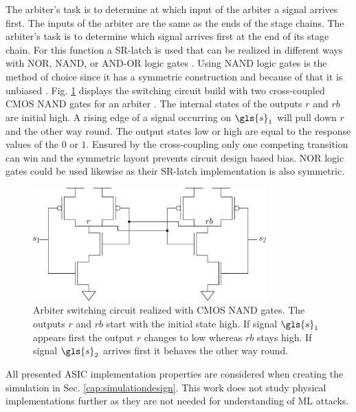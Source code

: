 The arbiter's task is to determine at which input of the arbiter a signal arrives first.
The inputs of the arbiter are the same as the ends of the stage chains.
The arbiter's task is to determine which signal arrives first at the end of its stage chain.
For this function a \ac{SR-latch} is used that can be realized in different ways with NOR, NAND, or AND-OR logic gates \cite{2016Flip-flopWikipedia}.
Using NAND logic gates is the method of choice since it has a symmetric construction and because of that it is unbiased \cite{Lin2010Low-powerFunctions, Maes2013PhysicallyApplications.}.
Fig. \ref{fig:nandarbiter} displays the switching circuit build with two cross-coupled \ac{CMOS} NAND gates for an arbiter \cite{2016NANDWikipedia}.
The internal states of the outputs $r$ and $rb$ are initial high. 
A rising edge of a signal occurring on $\gls{s}_1$ will pull down $r$ and the other way round.
The output states low or high are equal to the response values of the \puf $0$ or $1$.
Ensured by the cross-coupling only one competing transition can win and the symmetric layout prevents circuit design based bias.
NOR logic gates could be used likewise as their \ac{SR-latch} implementation is also symmetric.

\begin{figure}[ht]
\centering
\includegraphics[width=0.80\textwidth]{images/arbiter_circuit.eps}
\caption{Arbiter switching circuit realized with \ac{CMOS} NAND gates. The outputs $r$ and $rb$ start with the initial state high. If signal $\gls{s}_1$ appears first the output $r$ changes to low whereas $rb$ stays high. If signal $\gls{s}_2$ arrives first it behaves the other way round.}
\label{fig:nandarbiter}
\end{figure}

All presented \apuf \ac{ASIC} implementation properties are considered when creating the \apuf simulation in Sec. \ref{cap:simulationdesign}.
This work does not study physical \apuf implementations further as they are not needed for understanding of \ac{ML} attacks.

